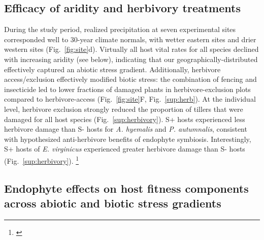 \documentclass[12pt]{article}\usepackage[]{graphicx}\usepackage[dvipsnames]{xcolor}
\newcommand{\tom}[2]{{\color{red}{#1}}\footnote{\textit{\color{red}{#2}}}}
\begin{document}
\subsection*{Efficacy of aridity and herbivory treatments}
During the study period, realized precipitation at seven experimental sites corresponded well to 30-year climate normals, with wetter eastern sites and drier western sites (Fig.~\ref{fig:site}d). 
Virtually all host vital rates for all species declined with increasing aridity (see below), indicating that our geographically-distributed effectively captured an abiotic stress gradient. 
Additionally, herbivore access/exclusion effectively modified biotic stress: the combination of fencing and insecticide led to lower fractions of damaged plants in herbivore-exclusion plots compared to herbivore-access (Fig.~\ref{fig:site}F, Fig.~\ref{sup:herb}). 
At the individual level, herbivore exclusion strongly reduced the proportion of tillers that were damaged for all host species (Fig.~\ref{sup:herbivory}). 
S+ hosts experienced less herbivore damage than S- hosts for \textit{A. hyemalis} and \textit{P. autumnalis}, consistent with hypothesized anti-herbivore benefits of endophyte symbiosis. 
Interestingly, S+ hosts of \textit{E. virginicus} experienced greater herbivore damage than S- hosts (Fig.~\ref{sup:herbivory}). 
\tom{}{It would be good to provide some descriptive statistics about the herbivory results, i.e. plants in herbivore access plots experienced XX\% tiller damage while exclusion reduced that to XX\%. Similar for the endophyte effect. The broader point here is that it is often helpful to describe effects of treatments on response variables in absolute terms, rather than simply relying on standardized regression coefficients to say there was an effect or not. This really struck me while reading the next section, where results are reported in terms of pr(delta>0), but that does carry much information in terms of how S+ and S- hosts differ in terms of survival, growth, and reproduction. A review may well ask for more of this type of information.}

\subsection*{Endophyte effects on host fitness components across abiotic and biotic stress gradients}
\end{document}
